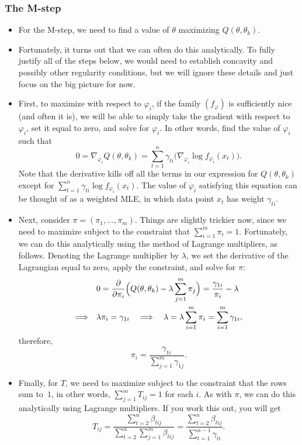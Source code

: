 \documentclass[12pt]{article}
\begin{document}
\subsubsection{The M-step}
\begin{itemize}
\item For the M-step, we need to find a value of $\theta$ maximizing $Q(\theta,\theta_k)$.
\item Fortunately, it turns out that we can often do this analytically. To fully justify all of the steps below, we would need to establish concavity and possibly other regularity conditions, but we will ignore these details and just focus on the big picture for now.
\item First, to maximize with respect to $\varphi_i$, if the family $(f_{\varphi})$ is sufficiently nice (and often it is), we will be able to simply take the gradient with respect to $\varphi_i$, set it equal to zero, and solve for $\varphi_i$. In other words, find the value of $\varphi_i$ such that
$$ 0 = \nabla_{\!\varphi_i} Q(\theta,\theta_k) = \sum_{t = 1}^n  \gamma_{t i} \big(\nabla_{\!\varphi_i} \log f_{\varphi_i}(x_t)\big). $$
Note that the derivative kills off all the terms in our expression for $Q(\theta,\theta_k)$ except for $\sum_{t = 1}^n \gamma_{t i} \log f_{\varphi_i}(x_t)$. The value of $\varphi_i$ satisfying this equation can be thought of as a weighted MLE, in which data point $x_t$ has weight $\gamma_{t i}$.
\item Next, consider $\pi =(\pi_1,\ldots,\pi_m)$. Things are slightly trickier now, since we need to maximize subject to the constraint that $ \sum_{i = 1}^m\pi_i = 1$. Fortunately, we can do this analytically using the method of Lagrange multipliers, as follows. Denoting the Lagrange multiplier by $\lambda$, we set the derivative of the Lagrangian equal to zero, apply the constraint, and solve for $\pi$:
\begin{align*}
& 0 ={\partial \over \partial \pi_i} \Big(Q(\theta,\theta_k) - \lambda \sum_{j = 1}^m \pi_j \Big) = {\gamma_{1 i} \over \pi_i}- \lambda\\
\Longrightarrow\quad & \lambda \pi_i = \gamma_{1 i} \quad\Longrightarrow\quad \lambda = \lambda \sum_{i = 1}^m \pi_i = \sum_{i = 1}^m \gamma_{1 i},
\end{align*}
therefore,
$$\pi_i = \frac{\gamma_{1 i}}{\sum_{j = 1}^m \gamma_{1 j}}.$$
\item Finally, for $T$, we need to maximize subject to the constraint that the rows sum to~$1$, in other words, $\sum_{j = 1}^m T_{i j} = 1$ for each $i$. As with $\pi$, we can do this analytically using Lagrange multipliers. If you work this out, you will get
$$ T_{i j} = \frac{\sum_{t = 2}^n \beta_{t i j}}{\sum_{t = 2}^n \sum_{j = 1}^m \beta_{t i j}} = \frac{\sum_{t = 2}^n \beta_{t i j}}{\sum_{t = 1}^{n -1} \gamma_{t i}}. $$
\end{itemize}
\end{document}
